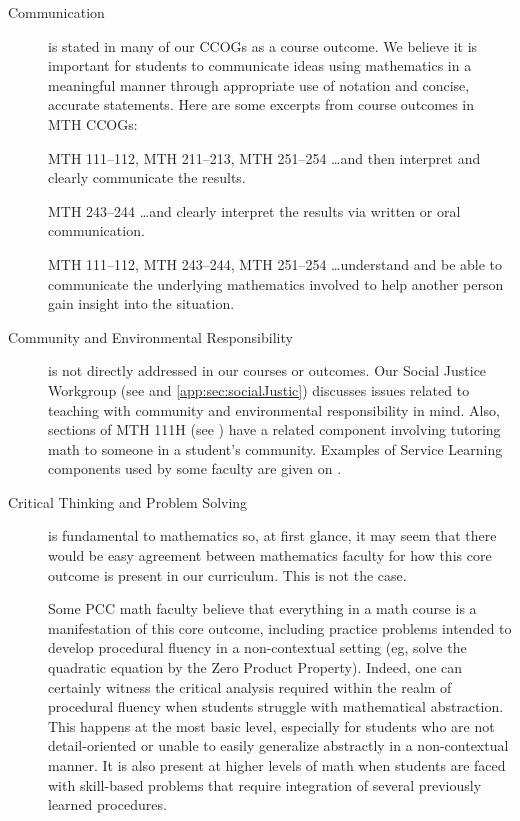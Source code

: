 \begin{description}
\item[Communication] is stated in many of our CCOGs as a course outcome. We
  believe it is important for students to communicate ideas using mathematics in
  a meaningful manner through appropriate use of notation and concise, accurate
  statements.  Here are some excerpts from course outcomes in MTH CCOGs: 
\begin{aquote}{MTH 111--112, MTH 211--213, MTH 251--254}
{\ldots}and then interpret and clearly communicate the results. 
\end{aquote}

\begin{aquote}{MTH 243--244}
{\ldots}and clearly interpret the results via written or oral communication. 
\end{aquote}

\begin{aquote}{MTH 111--112, MTH 243--244, MTH 251--254}
{\ldots}understand and be able to communicate the underlying mathematics
involved to help another person gain insight into the situation.
\end{aquote}

\item[Community and Environmental Responsibility] is not directly addressed in
  our courses or outcomes. Our Social Justice Workgroup
  (see  and \vref{app:sec:socialJustic}) discusses issues
  related to teaching with community and environmental responsibility in mind.
  Also, sections of MTH 111H (see ) have a related component
  involving tutoring math to someone in a student's community. Examples of 
  Service Learning components used by some faculty are given on .

\item[Critical Thinking and Problem Solving] 
is fundamental to mathematics so, at first glance, it may seem that there would
be easy agreement between mathematics faculty for how this core outcome is
present in our curriculum. This is not the case.
 
Some PCC math faculty believe that everything in a math course is a
manifestation of this core outcome, including practice problems intended to
develop procedural fluency in a non-contextual setting (eg, solve the quadratic
equation by the Zero Product Property). Indeed, one can certainly witness the
critical analysis required within the realm of procedural fluency when students
struggle with  mathematical abstraction. This happens at the most basic level,
especially for students who are not detail-oriented or unable to easily
generalize abstractly in a non-contextual manner. It is also present at higher
levels of math when students are faced with skill-based problems that require
integration of several previously learned procedures. 


\end{description}
